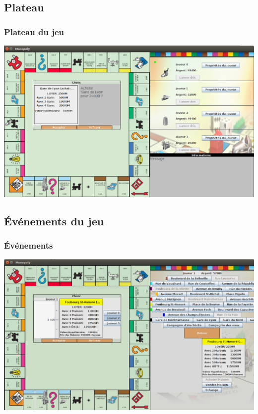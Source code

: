 \documentclass{beamer}
\begin{document}
\begin{darkframes}
	\subsection{Plateau} 	  
	\begin{frame}
 	 \frametitle{Plateau du jeu}
 	 \begin{center}
 	 \includegraphics[scale=0.25]{./img/plateau.png}
		
	\end{center}
    \end{frame}	
	
	\subsection{Événements du jeu} 	  
  	\begin{frame}
 	 \frametitle{Événements}
 	 \begin{center}
 	 \includegraphics[scale=0.25]{./img/plateauInGame2.png}
		
	\end{center}
    \end{frame}	
    

\end{darkframes}
\end{document}
